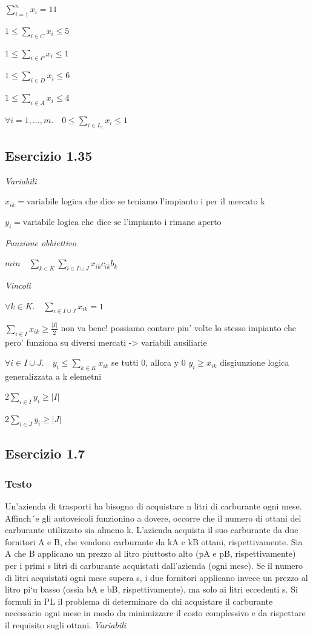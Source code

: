 $ \sum_{i=1}^{n} x_i = 11 $

$ 1 \leq \sum_{i \in C} x_i \leq 5 $

$ 1 \leq \sum_{i \in P} x_i \leq 1 $

$ 1 \leq \sum_{i \in D} x_i \leq 6 $

$ 1 \leq \sum_{i \in A} x_i \leq 4 $

$ \forall i = 1,...,m. \quad 0 \leq \sum_{i \in L_i} x_i  \leq 1 $

\subsection{Esercizio 1.35}

\textit{Variabili}

$ x_{ik} = \text{variabile logica che dice se teniamo l'impianto i per il mercato k} $

$ y_i = \text{variabile logica che dice se l'impianto i rimane aperto} $


\textit{Funzione obbiettivo}

$ min \quad \sum_{k \in K} \sum_{i \in I \cup J} x_{ik} c_{ik} b_k $

\textit{Vincoli}

$ \forall k \in K. \quad \sum_{i \in I \cup J} x_{ik} = 1 $

$ \sum_{i \in I} x_{ik} \geq \frac{|I|}{2} $ non va bene! possiamo contare piu' volte lo stesso impianto che pero' funziona su diversi mercati -> variabili ausiliarie 

$ \forall i \in I \cup J.\quad y_i \leq \sum_{k \in K} x_{ik} $ se tutti 0, allora y 0
$ y_i \geq x_{ik} $ disgiunzione logica generalizzata a k elemetni

$2 \sum_{i \in I} y_i \geq |I| $

$2 \sum_{i \in J} y_i \geq |J| $

\subsection{Esercizio 1.7}
\subsubsection{Testo}
Un’azienda di trasporti ha bisogno di
acquistare n litri di carburante ogni mese. Affinch´e gli autoveicoli funzionino a dovere, occorre
che il numero di ottani del carburante utilizzato sia almeno k. L’azienda acquista il suo
carburante da due fornitori A e B, che vendono carburante da kA e kB ottani, rispettivamente.
Sia A che B applicano un prezzo al litro piuttosto alto (pA e pB, rispettivamente) per i primi
s litri di carburante acquistati dall’azienda (ogni mese). Se il numero di litri acquistati ogni
mese supera s, i due fornitori applicano invece un prezzo al litro pi`u basso (ossia bA e bB,
rispettivamente), ma solo ai litri eccedenti s. Si formuli in PL il problema di determinare da
chi acquistare il carburante necessario ogni mese in modo da minimizzare il costo complessivo e
da rispettare il requisito sugli ottani.
\textit{Variabili}

